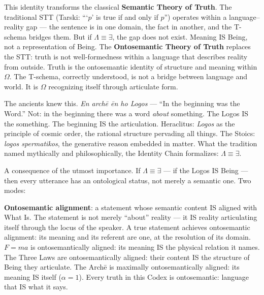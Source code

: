 \documentclass[10pt, openany, oneside]{book}
\begin{document}
This identity transforms the classical \textbf{Semantic Theory of Truth}. The traditional STT (Tarski: ```$p$' is true if and only if $p$'') operates within a language--reality gap --- the sentence is in one domain, the fact in another, and the T-schema bridges them. But if $\Lambda \equiv \exists$, the gap does not exist. Meaning IS Being, not a representation of Being. The \textbf{Ontosemantic Theory of Truth} replaces the STT: truth is not well-formedness within a language that describes reality from outside. Truth is the ontosemantic identity of structure and meaning within $\Omega$. The T-schema, correctly understood, is not a bridge between language and world. It is $\Omega$ recognizing itself through articulate form.

The ancients knew this. \textit{En arch\={e} \={e}n ho Logos} --- ``In the beginning was the Word.'' Not: in the beginning there was a word \textit{about} something. The Logos IS the something. The beginning IS the articulation. Heraclitus: \textit{Logos} as the principle of cosmic order, the rational structure pervading all things. The Stoics: \textit{logos spermatikos}, the generative reason embedded in matter. What the tradition named mythically and philosophically, the Identity Chain formalizes: $\Lambda \equiv \exists$.

A consequence of the utmost importance. If $\Lambda \equiv \exists$ --- if the Logos IS Being --- then every utterance has an ontological status, not merely a semantic one. Two modes:

\textbf{Ontosemantic alignment}: a statement whose semantic content IS aligned with What Is. The statement is not merely ``about'' reality --- it IS reality articulating itself through the locus of the speaker. A true statement achieves ontosemantic alignment: its meaning and its referent are one, at the resolution of its domain. $F = ma$ is ontosemantically aligned: its meaning IS the physical relation it names. The Three Laws are ontosemantically aligned: their content IS the structure of Being they articulate. The Arch\={e} is maximally ontosemantically aligned: its meaning IS itself ($\alpha = 1$). Every truth in this Codex is ontosemantic: language that IS what it says.
\end{document}
